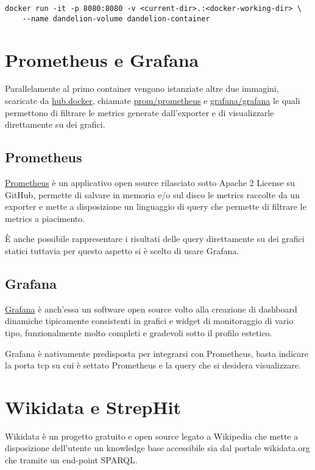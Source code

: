 \begin{lstlisting}[style=YmlStyle, caption=Run Docker]
    docker run -it -p 8080:8080 -v <current-dir>.:<docker-working-dir> \
    --name dandelion-volume dandelion-container
\end{lstlisting}

\section{Prometheus e Grafana}
Parallelamente al primo container vengono istanziate altre due immagini, scaricate da \href{https://hub.docker.com/}{hub.docker}, chiamate \href{https://hub.docker.com/r/prom/prometheus/}{prom/prometheus} 
e \href{https://hub.docker.com/r/grafana/grafana/}{grafana/grafana} le quali permettono di filtrare le metrics generate dall'exporter e di visualizzarle direttamente su dei grafici. 

\subsection{Prometheus}
\href{https://prometheus.io/}{Prometheus} è un applicativo open source rilasciato sotto Apache 2 License su GitHub, permette di salvare in memoria e/o sul disco le metrics raccolte da un exporter e mette a disposizione 
un linguaggio di query che permette di filtrare le metrics a piacimento. 

È anche possibile rappresentare i risultati delle query direttamente su dei grafici statici tuttavia per questo aspetto si è scelto di usare Grafana.

\subsection{Grafana}
\href{https://grafana.com/}{Grafana} è anch'essa un software open source volto alla creazione di dashboard dinamiche tipicamente consistenti in grafici e widget di monitoraggio di vario tipo, funzionalmente molto completi 
e gradevoli sotto il profilo estetico. 

Grafana è nativamente predisposta per integrarsi con Prometheus, basta indicare la porta tcp su cui è settato Prometheus e la query che si desidera visualizzare.   

\section{Wikidata e StrepHit}
Wikidata è un progetto gratuito e open source legato a Wikipedia che mette a disposizione dell'utente un knowledge base accessibile sia dal portale wikidata.org che tramite un end-point SPARQL.

